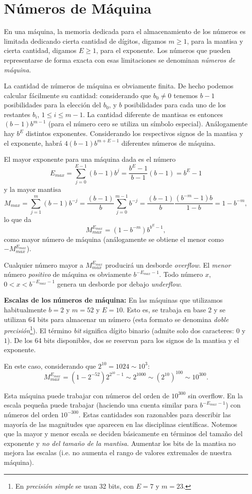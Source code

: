 \section{Números de Máquina}
En una máquina, la memoria dedicada para el almacenamiento de los números es limitada dedicando cierta cantidad de dígitos, digamos $m\ge 1$, para la mantisa y cierta cantidad, digamos $E\ge 1$, para el exponente. Los números que pueden representarse de forma exacta con esas limitaciones se denominan \emph{números de máquina}.

La cantidad de números de máquina es obviamente finita.  De hecho podemos calcular fácilmente su cantidad: considerando que $b_0\neq 0$ tenemos $b-1$ posibilidades para la elección del $b_0$, y $b$ posibilidades para cada uno de los restantes $b_i$, $1\le i\le m-1$. La cantidad diferente de mantisas es entonces $(b-1)b^{m-1}$ (para el número cero se utiliza un símbolo especial). Análogamente hay $b^{E}$ distintos exponentes. Considerando los respectivos signos de la mantisa y el exponente, habrá
$4(b-1)b^{m+E-1}$ diferentes números de máquina.

El mayor exponente para una máquina dada es el número
$$E_{max}=\sum_{j=0}^{E-1}(b-1)b^j=\frac{b^E-1}{b-1}(b-1)=b^E-1$$ y la mayor mantisa $$M_{max}=\sum_{j=1}^{m}(b-1)b^{-j}=\frac{(b-1)}{b}\sum_{j=0}^{m-1}b^{-j}=\frac{(b-1)}{b}\frac{(b^{-m}-1)b}{1-b}=1-b^{-m},$$ lo que da
$$
M_{max}^{E_{max}}=\left(1-b^{-m}\right)b^{b^E-1},
$$
como mayor número de máquina (análogamente se obtiene el menor como $-M_{max}^{E_{max}}$).

Cualquier número mayor a $M_{max}^{E_{max}}$ producirá  un desborde \emph{overflow}. El \emph{menor} número \emph{positivo} de máquina es obviamente $b^{-E_{max}-1}$. Todo número $x$, $0<x<b^{-E_{max}-1}$ genera un desborde por debajo \emph{underflow}.

\begin{tcolorbox}{\bf Escalas de los números de máquina:}
 En las máquinas que utilizamos habitualmente $b=2$ y $m=52$ y $E=10$. Esto es, se trabaja en base $2$ y se utilizan 64 bits para almacenar un número (esta formato se denomina \emph{doble precisión}\footnote{En \emph{precisión simple} se usan 32 bits, con $E=7$ y $m=23$.}). El término \emph{bit} significa dígito binario (admite solo dos caracteres: $0$ y $1$). De los 64 bits disponibles, dos se reservan para los signos de la mantisa y el exponente.

 En este caso, considerando que $2^{10}=1024\sim 10^3$:
$$M_{max}^{E_{max}}=(1-2^{-52})2^{2^{10}-1}\sim 2^{1000}\sim (2^{10})^{100}\sim 10^{300}.$$

Esta máquina puede trabajar con números del orden de $10^{300}$ sin overflow. En la escala pequeña puede trabajar (haciendo una cuenta similar para $b^{-E_{max}-1}$) con números del orden $10^{-300}$. Estas cantidades son razonables para describir las mayoría de las magnitudes que aparecen en las disciplinas científicas.
Notemos que la mayor y menor escala se deciden básicamente en términos del tamaño del exponente y \emph{no del tamaño de la mantisa}. Aumentar los bits de la mantisa no mejora las escalas (i.e. no aumenta el rango de valores extremales de nuestra máquina).
\end{tcolorbox}


